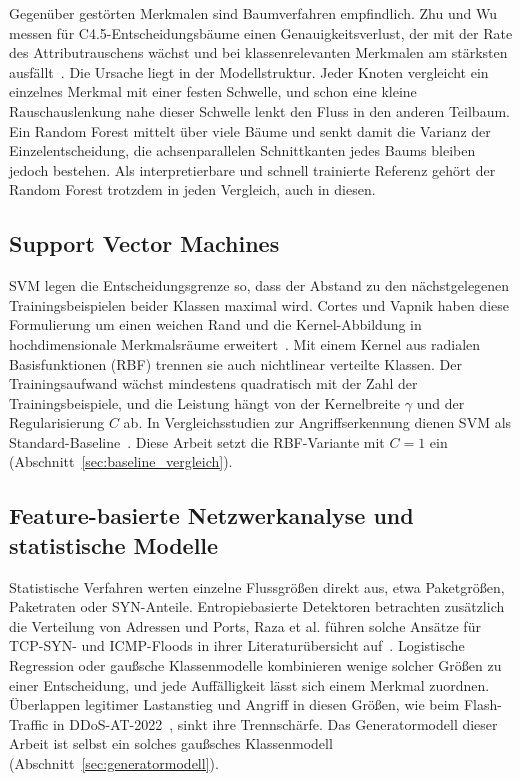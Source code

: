 Gegenüber gestörten Merkmalen sind Baumverfahren empfindlich. Zhu und Wu messen für C4.5-Entscheidungsbäume einen Genauigkeitsverlust, der mit der Rate des Attributrauschens wächst und bei klassenrelevanten Merkmalen am stärksten ausfällt~\autocite{zhuClassNoiseVs2004}. Die Ursache liegt in der Modellstruktur. Jeder Knoten vergleicht ein einzelnes Merkmal mit einer festen Schwelle, und schon eine kleine Rauschauslenkung nahe dieser Schwelle lenkt den Fluss in den anderen Teilbaum. Ein Random Forest mittelt über viele Bäume und senkt damit die Varianz der Einzelentscheidung, die achsenparallelen Schnittkanten jedes Baums bleiben jedoch bestehen. Als interpretierbare und schnell trainierte Referenz gehört der Random Forest trotzdem in jeden Vergleich, auch in diesen.

\subsection{Support Vector Machines}

SVM legen die Entscheidungsgrenze so, dass der Abstand zu den nächstgelegenen Trainingsbeispielen beider Klassen maximal wird. Cortes und Vapnik haben diese Formulierung um einen weichen Rand und die Kernel-Abbildung in hochdimensionale Merkmalsräume erweitert~\autocite{cortesSupportvectorNetworks1995}. Mit einem Kernel aus radialen Basisfunktionen (RBF) trennen sie auch nichtlinear verteilte Klassen. Der Trainingsaufwand wächst mindestens quadratisch mit der Zahl der Trainingsbeispiele, und die Leistung hängt von der Kernelbreite $\gamma$ und der Regularisierung $C$ ab. In Vergleichsstudien zur Angriffserkennung dienen SVM als Standard-Baseline~\autocite{camineroAdversarialEnvironmentReinforcement2019, arjouneNovelJammingAttacks2020}. Diese Arbeit setzt die RBF-Variante mit $C=1$ ein (Abschnitt~\ref{sec:baseline_vergleich}).

\subsection{Feature-basierte Netzwerkanalyse und statistische Modelle}

Statistische Verfahren werten einzelne Flussgrößen direkt aus, etwa Paketgrößen, Paketraten oder SYN-Anteile. Entropiebasierte Detektoren betrachten zusätzlich die Verteilung von Adressen und Ports, Raza et al. führen solche Ansätze für TCP-SYN- und ICMP-Floods in ihrer Literaturübersicht auf~\autocite{razaFeatureSelectionBasedDDoSAttack2024}. Logistische Regression oder gaußsche Klassenmodelle kombinieren wenige solcher Größen zu einer Entscheidung, und jede Auffälligkeit lässt sich einem Merkmal zuordnen. Überlappen legitimer Lastanstieg und Angriff in diesen Größen, wie beim Flash-Traffic in \mbox{DDoS-AT-2022}~\autocite{mittalDDoSAT2022DistributedDenial2023}, sinkt ihre Trennschärfe. Das Generatormodell dieser Arbeit ist selbst ein solches gaußsches Klassenmodell (Abschnitt~\ref{sec:generatormodell}).

